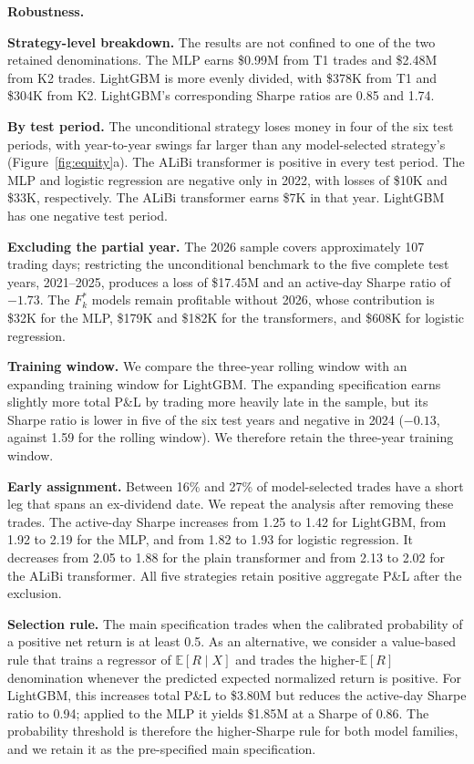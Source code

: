 \documentclass[sigconf]{acmart}
\begin{document}
\smallskip\noindent\textbf{Robustness.}
\label{sec:robustness}

\noindent\textbf{Strategy-level breakdown.}
The results are not confined to one of the two retained denominations. The MLP earns \$0.99M from T1 trades and \$2.48M from K2 trades. LightGBM is more evenly divided, with \$378K from T1 and \$304K from K2. LightGBM's corresponding Sharpe ratios are 0.85 and 1.74.

\noindent\textbf{By test period.}
The unconditional strategy loses money in four of the six test periods, with year-to-year swings far larger than any model-selected strategy's (Figure~\ref{fig:equity}a). The ALiBi transformer is positive in every test period. The MLP and logistic regression are negative only in 2022, with losses of \$10K and \$33K, respectively. The ALiBi transformer earns \$7K in that year. LightGBM has one negative test period.

\noindent\textbf{Excluding the partial year.}
The 2026 sample covers approximately 107 trading days; restricting the unconditional benchmark to the five complete test years, 2021--2025, produces a loss of \$17.45M and an active-day Sharpe ratio of $-1.73$. The $F_k^\ast$ models remain profitable without 2026, whose contribution is \$32K for the MLP, \$179K and \$182K for the transformers, and \$608K for logistic regression.

\noindent\textbf{Training window.}
We compare the three-year rolling window with an expanding training window for LightGBM. The expanding specification earns slightly more total P\&L by trading more heavily late in the sample, but its Sharpe ratio is lower in five of the six test years and negative in 2024 ($-0.13$, against 1.59 for the rolling window). We therefore retain the three-year training window.

\noindent\textbf{Early assignment.}
Between 16\% and 27\% of model-selected trades have a short leg that spans an ex-dividend date. We repeat the analysis after removing these trades. The active-day Sharpe increases from 1.25 to 1.42 for LightGBM, from 1.92 to 2.19 for the MLP, and from 1.82 to 1.93 for logistic regression. It decreases from 2.05 to 1.88 for the plain transformer and from 2.13 to 2.02 for the ALiBi transformer. All five strategies retain positive aggregate P\&L after the exclusion.

\noindent\textbf{Selection rule.}
The main specification trades when the calibrated probability of a positive net return is at least 0.5. As an alternative, we consider a value-based rule that trains a regressor of $\mathbb{E}[R\mid X]$ and trades the higher-$\mathbb{E}[R]$ denomination whenever the predicted expected normalized return is positive. For LightGBM, this increases total P\&L to \$3.80M but reduces the active-day Sharpe ratio to 0.94; applied to the MLP it yields \$1.85M at a Sharpe of 0.86. The probability threshold is therefore the higher-Sharpe rule for both model families, and we retain it as the pre-specified main specification.
\end{document}
